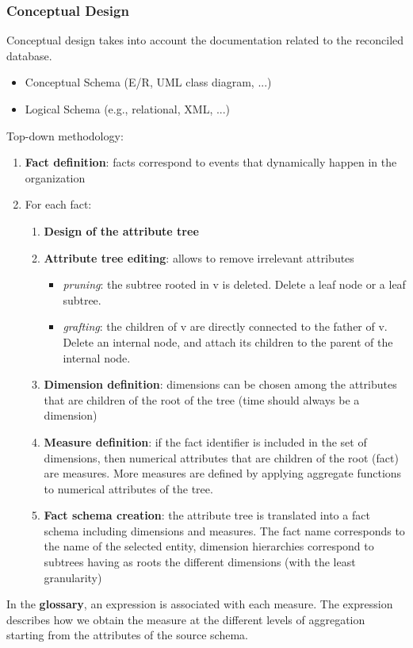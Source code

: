 \documentclass[10pt,a4paper]{article}
\begin{document}
\subsubsection{Conceptual Design}
Conceptual design takes into account the documentation related to the reconciled database.
\begin{itemize}
	\item Conceptual Schema (E/R, UML class diagram, ...)
	\item Logical Schema (e.g., relational, XML, ...)
\end{itemize}
Top-down methodology:
\begin{enumerate}
	\item \textbf{Fact definition}: facts correspond to events that dynamically happen in the organization 
	\item For each fact:
	\begin{enumerate}
		\item \textbf{Design of the attribute tree}
		\item \textbf{Attribute tree editing}: allows to remove irrelevant attributes
		\begin{itemize}
			\item \textit{pruning}: the subtree rooted in v is deleted. Delete a leaf node or a leaf subtree.
			\item \textit{grafting}: the children of v are directly connected to the father of v. Delete an internal node, and attach its children to the parent of the internal node.
		\end{itemize}
		\item \textbf{Dimension definition}: dimensions can be chosen among the attributes that are children of the root of the tree (time should always be a dimension)
		\item \textbf{Measure definition}: if the fact identifier is included in the set of dimensions, then numerical attributes that are children of the root (fact) are measures. More measures are defined by applying aggregate functions to numerical attributes of the tree.
		\item \textbf{Fact schema creation}: the attribute tree is translated into a fact schema including dimensions and measures. The fact name corresponds to the name of the selected entity, dimension hierarchies correspond to subtrees having as roots the different dimensions (with the least granularity)
	\end{enumerate}
\end{enumerate}
In the \textbf{glossary}, an expression is associated with each measure. The expression describes how we obtain the measure at the different levels of aggregation starting from the attributes of the source schema. 
\pagebreak
\end{document}
